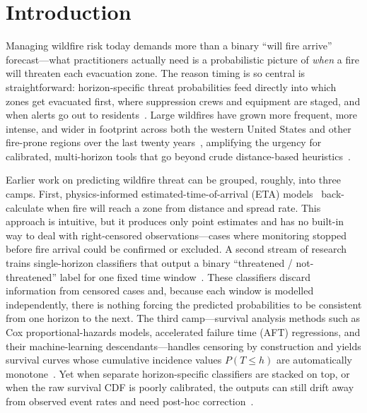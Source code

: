 \documentclass[fire,article,submit,pdftex]{../Definitions/mdpi}
\begin{document}

\section{Introduction}\label{sec:introduction}

Managing wildfire risk today demands more than a binary ``will fire arrive'' forecast---what practitioners actually need is a probabilistic picture of \emph{when} a fire will threaten each evacuation zone.
The reason timing is so central is straightforward: horizon-specific threat probabilities feed directly into which zones get evacuated first, where suppression crews and equipment are staged, and when alerts go out to residents~\cite{Finney2001,Xi2019,Stephens2018}.
Large wildfires have grown more frequent, more intense, and wider in footprint across both the western United States and other fire-prone regions over the last twenty years~\cite{Jain2022,Cunningham2024,Turco2023,Luo2024,Jones2022,Kolden2024,Higuera2021}, amplifying the urgency for calibrated, multi-horizon tools that go beyond crude distance-based heuristics~\cite{Radeloff2023,Tonini2020}.

Earlier work on predicting wildfire threat can be grouped, roughly, into three camps.
First, physics-informed estimated-time-of-arrival (ETA) models~\cite{Finney2001,Cruz2003} back-calculate when fire will reach a zone from distance and spread rate. This approach is intuitive, but it produces only point estimates and has no built-in way to deal with right-censored observations---cases where monitoring stopped before fire arrival could be confirmed or excluded.
A second stream of research trains single-horizon classifiers that output a binary ``threatened / not-threatened'' label for one fixed time window~\cite{Jaafari2019,Gigovic2019,Chen2024wui}. These classifiers discard information from censored cases and, because each window is modelled independently, there is nothing forcing the predicted probabilities to be consistent from one horizon to the next.
The third camp---survival analysis methods such as Cox proportional-hazards models, accelerated failure time (AFT) regressions, and their machine-learning descendants---handles censoring by construction and yields survival curves whose cumulative incidence values $P(T \leq h)$ are automatically monotone~\cite{Wiegrebe2024,Taylor2013}. Yet when separate horizon-specific classifiers are stacked on top, or when the raw survival CDF is poorly calibrated, the outputs can still drift away from observed event rates and need post-hoc correction~\cite{VanCalster2019}.
\end{document}
